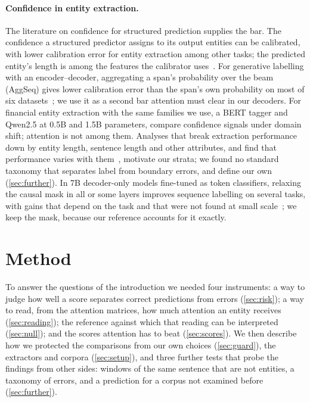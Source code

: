 \documentclass[11pt,a4paper]{article}
\begin{document}
\paragraph{Confidence in entity extraction.} The literature on confidence for structured prediction supplies the bar.
The confidence a structured predictor assigns to its output entities can be calibrated, with lower calibration error for
entity extraction among other tasks; the predicted entity's length is among the features the calibrator
uses~\citep{jagannatha2020calibrating}. For generative labelling with an encoder--decoder, aggregating a span's probability over the beam
(AggSeq) gives lower calibration error than the span's own probability on most of six datasets~\citep{hashimoto2024beam}; we
use it as a second bar attention must clear in our decoders. For financial entity extraction with the same
families we use, a BERT tagger and Qwen2.5 at 0.5B and 1.5B parameters, \citet{zheng2026financial} compare confidence signals
under domain shift; attention is not among them. Analyses that break extraction performance down by entity length, sentence length and other
attributes, and find that performance varies with them~\citep{fu2020interpretable}, motivate our strata; we found no standard taxonomy that separates label from boundary
errors, and define our own (\cref{sec:further}). In 7B decoder-only models fine-tuned as token classifiers, relaxing the causal mask in all or some layers improves
sequence labelling on several tasks, with gains that depend on the task and that were not found at small
scale~\citep{dukic2024lookingright}; we keep the mask, because our reference accounts for it exactly.


\section{Method}
\label{sec:method}

To answer the questions of the introduction we needed four instruments: a way to judge how well a score
separates correct predictions from errors (\cref{sec:risk}); a way to read, from the attention matrices, how
much attention an entity receives (\cref{sec:reading}); the reference against which that reading can be
interpreted (\cref{sec:null}); and the scores attention has to beat (\cref{sec:scores}). We then describe how we
protected the comparisons from our own choices (\cref{sec:guard}), the extractors and corpora (\cref{sec:setup}), and three
further tests that probe the findings from other sides: windows of the same sentence that are not entities, a taxonomy of
errors, and a prediction for a corpus not examined before (\cref{sec:further}).
\end{document}
